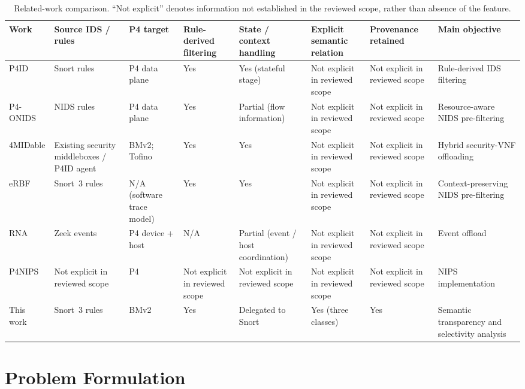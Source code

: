 \documentclass{article}
\begin{document}
\begin{landscape}
\begin{table}[p]
\centering
\small
\setlength{\tabcolsep}{2pt}
\renewcommand{\arraystretch}{0.95}
\caption{Related-work comparison. ``Not explicit'' denotes information not
established in the reviewed scope, rather than absence of the feature.}
\label{tab:related-work-comparison}
\begin{tabular}{L{1.45cm}L{2.20cm}L{1.90cm}L{2.00cm}L{2.35cm}L{2.80cm}L{2.20cm}L{3.25cm}}
\toprule
\textbf{Work} & \textbf{Source IDS / rules} & \textbf{P4 target} & \textbf{Rule-derived filtering} & \textbf{State / context handling} & \textbf{Explicit semantic relation} & \textbf{Provenance retained} & \textbf{Main objective} \\
\midrule
P4ID & Snort rules & P4 data plane & Yes & Yes (stateful stage) & Not explicit in reviewed scope & Not explicit in reviewed scope & Rule-derived IDS filtering \\
P4-ONIDS & NIDS rules & P4 data plane & Yes & Partial (flow information) & Not explicit in reviewed scope & Not explicit in reviewed scope & Resource-aware NIDS pre-filtering \\
4MIDable & Existing security middleboxes / P4ID agent & BMv2; Tofino & Yes & Yes & Not explicit in reviewed scope & Not explicit in reviewed scope & Hybrid security-VNF offloading \\
eRBF & Snort~3 rules & N/A (software trace model) & Yes & Yes & Not explicit in reviewed scope & Not explicit in reviewed scope & Context-preserving NIDS pre-filtering \\
RNA & Zeek events & P4 device + host & N/A & Partial (event / host coordination) & Not explicit in reviewed scope & Not explicit in reviewed scope & Event offload \\
P4NIPS & Not explicit in reviewed scope & P4 & Not explicit in reviewed scope & Not explicit in reviewed scope & Not explicit in reviewed scope & Not explicit in reviewed scope & NIPS implementation \\
This work & Snort~3 rules & BMv2 & Yes & Delegated to Snort & Yes (three classes) & Yes & Semantic transparency and selectivity analysis \\
\bottomrule
\end{tabular}
\end{table}
\end{landscape}

\section{Problem Formulation}
\label{sec:problem}
\end{document}
